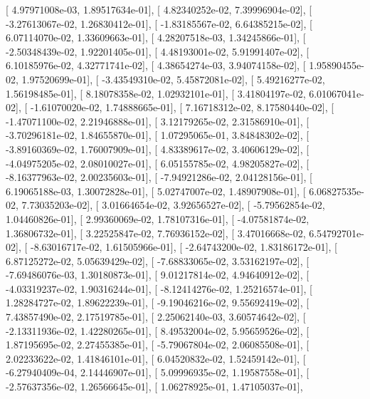 \documentclass{article}
\begin{document}
       [  4.97971008e-03,   1.89517634e-01],
       [  4.82340252e-02,   7.39996904e-02],
       [ -3.27613067e-02,   1.26830412e-01],
       [ -1.83185567e-02,   6.64385215e-02],
       [  6.07114070e-02,   1.33609663e-01],
       [  4.28207518e-03,   1.34245866e-01],
       [ -2.50348439e-02,   1.92201405e-01],
       [  4.48193001e-02,   5.91991407e-02],
       [  6.10185976e-02,   4.32771741e-02],
       [  4.38654274e-03,   3.94074158e-02],
       [  1.95890455e-02,   1.97520699e-01],
       [ -3.43549310e-02,   5.45872081e-02],
       [  5.49216277e-02,   1.56198485e-01],
       [  8.18078358e-02,   1.02932101e-01],
       [  3.41804197e-02,   6.01067041e-02],
       [ -1.61070020e-02,   1.74888665e-01],
       [  7.16718312e-02,   8.17580440e-02],
       [ -1.47071100e-02,   2.21946888e-01],
       [  3.12179265e-02,   2.31586910e-01],
       [ -3.70296181e-02,   1.84655870e-01],
       [  1.07295065e-01,   3.84848302e-02],
       [ -3.89160369e-02,   1.76007909e-01],
       [  4.83389617e-02,   3.40606129e-02],
       [ -4.04975205e-02,   2.08010027e-01],
       [  6.05155785e-02,   4.98205827e-02],
       [ -8.16377963e-02,   2.00235603e-01],
       [ -7.94921286e-02,   2.04128156e-01],
       [  6.19065188e-03,   1.30072828e-01],
       [  5.02747007e-02,   1.48907908e-01],
       [  6.06827535e-02,   7.73035203e-02],
       [  3.01664654e-02,   3.92656527e-02],
       [ -5.79562854e-02,   1.04460826e-01],
       [  2.99360069e-02,   1.78107316e-01],
       [ -4.07581874e-02,   1.36806732e-01],
       [  3.22525847e-02,   7.76936152e-02],
       [  3.47016668e-02,   6.54792701e-02],
       [ -8.63016717e-02,   1.61505966e-01],
       [ -2.64743200e-02,   1.83186172e-01],
       [  6.87125272e-02,   5.05639429e-02],
       [ -7.68833065e-02,   3.53162197e-02],
       [ -7.69486076e-03,   1.30180873e-01],
       [  9.01217814e-02,   4.94640912e-02],
       [ -4.03319237e-02,   1.90316244e-01],
       [ -8.12414276e-02,   1.25216574e-01],
       [  1.28284727e-02,   1.89622239e-01],
       [ -9.19046216e-02,   9.55692419e-02],
       [  7.43857490e-02,   2.17519785e-01],
       [  2.25062140e-03,   3.60574642e-02],
       [ -2.13311936e-02,   1.42280265e-01],
       [  8.49532004e-02,   5.95659526e-02],
       [  1.87195695e-02,   2.27455385e-01],
       [ -5.79067804e-02,   2.06085508e-01],
       [  2.02233622e-02,   1.41846101e-01],
       [  6.04520832e-02,   1.52459142e-01],
       [ -6.27940409e-04,   2.14446907e-01],
       [  5.09996935e-02,   1.19587558e-01],
       [ -2.57637356e-02,   1.26566645e-01],
       [  1.06278925e-01,   1.47105037e-01],
\end{document}
